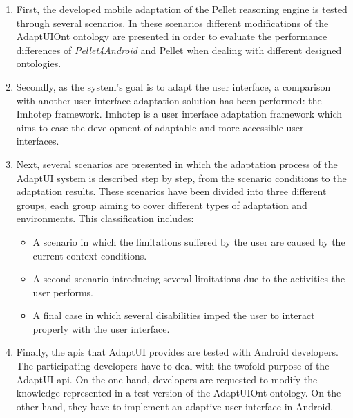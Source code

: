 \begin{enumerate}[label=\alph*)]
  \item First, the developed mobile adaptation of the Pellet reasoning engine 
  is tested through several scenarios. In these scenarios different modifications 
  of the AdaptUIOnt ontology are presented in order to evaluate the performance 
  differences of \textit{Pellet4Android} and Pellet when dealing with different
  designed ontologies.
  
  \item Secondly, as the system's goal is to adapt the user interface, a comparison 
  with another user interface adaptation solution has been performed: the 
  Imhotep framework. Imhotep is a user interface adaptation framework which 
  aims to ease the development of adaptable and more accessible user interfaces.
  
  \item Next, several scenarios are presented in which the adaptation process
  of the AdaptUI system is described step by step, from the scenario conditions
  to the adaptation results. These scenarios have been divided into three 
  different groups, each group aiming to cover different types of adaptation 
  and environments. This classification includes:
  \begin{itemize}
    \item A scenario in which the limitations suffered by the user are caused
    by the current context conditions. 
    
    \item A second scenario introducing several limitations due to the  
    activities the user performs.
    
    \item A final case in which several disabilities imped the user to interact 
    properly with the user interface.
  \end{itemize}
  
  \item Finally, the \acp{api} that AdaptUI provides are tested with Android
  developers. The participating developers have to deal with the twofold purpose
  of the AdaptUI \ac{api}. On the one hand, developers are requested to modify
  the knowledge represented in a test version of the AdaptUIOnt ontology. On the
  other hand, they have to implement an adaptive user interface in Android.
\end{enumerate}

